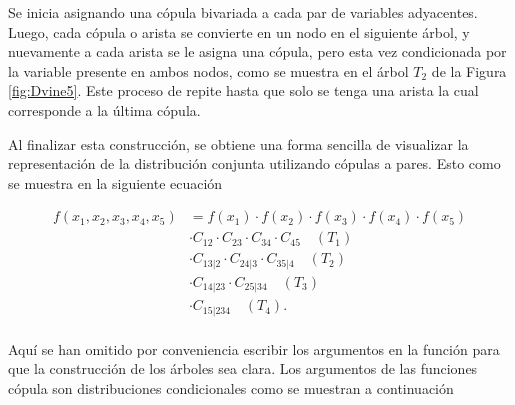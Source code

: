 Se inicia asignando una cópula bivariada a cada par de variables adyacentes. Luego, cada cópula o arista se convierte en un nodo en el siguiente árbol, y nuevamente a cada arista se le asigna una cópula, pero esta vez condicionada por la variable presente en ambos nodos, como se muestra en el árbol $T_2$ de la Figura \ref{fig:Dvine5}. Este proceso de repite hasta que solo se tenga una arista la cual corresponde a la última cópula. 


Al finalizar esta construcción, se obtiene una forma sencilla de visualizar la representación de la distribución conjunta utilizando cópulas a pares. Esto como se muestra en la siguiente ecuación

\vspace{-0.5cm}
\begin{equation}\label{dist5}
     \begin{split}
         f(x_1, x_2, x_3, x_4, x_5) & = f(x_1) \cdot f(x_2) \cdot f(x_3) \cdot f(x_4) \cdot f(x_5)  \\
         & \cdot C_{12} \cdot C_{23} \cdot C_{34} \cdot C_{45} \quad (T_1)\\
         & \cdot C_{13|2} \cdot C_{24|3} \cdot C_{35|4} \quad (T_2)\\\
         & \cdot C_{14|23} \cdot C_{25|34} \quad (T_3)\\
         & \cdot C_{15|234} \quad (T_4). \\
     \end{split}
\end{equation}

Aquí se han omitido por conveniencia escribir los argumentos en la función para que la construcción de los árboles sea clara. Los argumentos de las funciones cópula son distribuciones condicionales como se muestran a continuación

